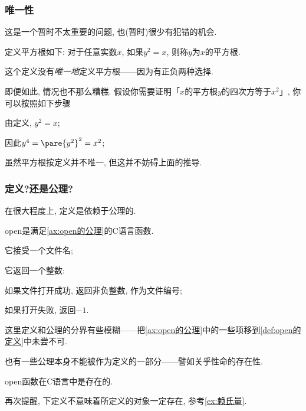 \documentclass[hidelinks]{ctexart}
\begin{document}

\subsubsection{唯一性} %
\label{ssub:唯一性}

这是一个暂时不太重要的问题, 也(暂时)很少有犯错的机会.
\begin{sample}
    \begin{ex}
        定义平方根如下: 对于任意实数$x$, 如果$y^2=x$, 则称$y$为$x$的平方根.
    \end{ex}
    这个定义没有\emph{唯一地}定义平方根——因为有正负两种选择.
\end{sample}
即便如此, 情况也不那么糟糕. 假设你需要证明「$x$的平方根$y$的四次方等于$x^2$」, 你可以按照如下步骤
\begin{cenum}
    \item 由定义, $y^2=x$;
    \item 因此$y^4 = \pare{y^2}^2 = x^2$;
\end{cenum}
虽然平方根按定义并不唯一, 但这并不妨碍上面的推导.


\subsubsection{定义?还是公理?} %
\label{ssub:定义_还是公理_}

在很大程度上, 定义是依赖于公理的.
\begin{sample}
    \begin{definition}
        \label{def:open的定义}
        {\ttfamily open}是满足\cref{ax:open的公理}的{\ttfamily C}语言函数.
    \end{definition}
    \begin{axiom}
        \label{ax:open的公理}
        \quad
        \begin{cenum}
            \item 它接受一个文件名;
            \item 它返回一个整数:
            \begin{cenum}
                \item 如果文件打开成功, 返回非负整数, 作为文件编号;
                \item 如果打开失败, 返回$-1$.
            \end{cenum}
        \end{cenum}
    \end{axiom}
    这里定义和公理的分界有些模糊——把\cref{ax:open的公理}中的一些项移到\cref{def:open的定义}中未尝不可.
\end{sample}
也有一些公理本身不能被作为定义的一部分——譬如关乎性命的存在性.
\begin{sample}
    \begin{axiom}
        {\ttfamily open}函数在{\ttfamily C}语言中是存在的.
    \end{axiom}
\end{sample}
\begin{pitfall}
    再次提醒, 下定义不意味着所定义的对象一定存在, 参考\cref{ex:赖氏量}.
\end{pitfall}
\end{document}
